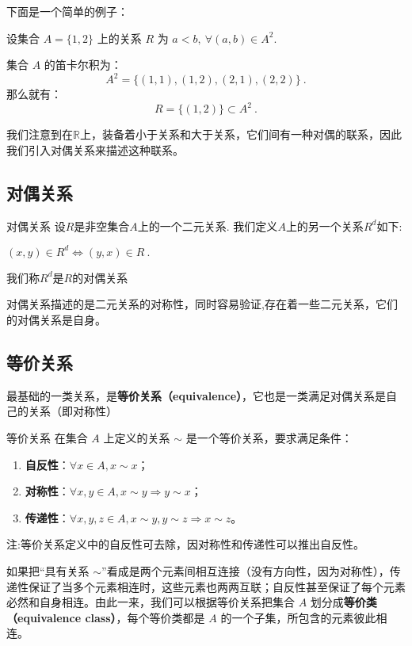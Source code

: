 下面是一个简单的例子：

\begin{example}{}
设集合 $A=\{1,2\}$ 上的关系 $R$ 为 $a<b,\ \forall (a,b)\in A^2$.

集合 $A$ 的笛卡尔积为：
\begin{equation}
A^2 = \{(1,1),(1,2),(2,1),(2,2)\}~.
\end{equation}
那么就有：
\begin{equation}
R=\{(1,2)\}\subset A^2~.
\end{equation}

\end{example}

我们注意到在$\mathbb{R}$上，装备着小于关系和大于关系，它们间有一种对偶的联系，因此我们引入对偶关系来描述这种联系。

\subsection{对偶关系}
\begin{definition}{对偶关系}
设$R$是非空集合$A$上的一个二元关系. 我们定义$A$上的另一个关系$R^{d}$如下:

$(x, y) \in R^{d} \Leftrightarrow(y, x) \in R~.$

我们称$R^{d}$是$R$的对偶关系

\end{definition}
对偶关系描述的是二元关系的对称性，同时容易验证,存在着一些二元关系，它们的对偶关系是自身。

\subsection{等价关系}\label{sub_Relat_1}
最基础的一类关系，是\textbf{等价关系（equivalence）}，它也是一类满足对偶关系是自己的关系（即对称性） 
\begin{definition}{等价关系}
在集合 $A$ 上定义的关系 $\sim$ 是一个等价关系，要求满足条件：
\begin{enumerate}
\item \textbf{自反性}：$\forall x\in A, x\sim x$；
\item \textbf{对称性}：$\forall x, y\in A, x\sim y \Rightarrow y\sim x$；
\item \textbf{传递性}：$\forall x, y, z\in A, x\sim y, y\sim z\Rightarrow x\sim z$。
\end{enumerate}
注:等价关系定义中的自反性可去除，因对称性和传递性可以推出自反性。
\end{definition}
如果把“具有关系 $\sim$”看成是两个元素间相互连接（没有方向性，因为对称性），传递性保证了当多个元素相连时，这些元素也两两互联；自反性甚至保证了每个元素必然和自身相连。由此一来，我们可以根据等价关系把集合 $A$ 划分成\textbf{等价类（equivalence class）}，每个等价类都是 $A$ 的一个子集，所包含的元素彼此相连。

